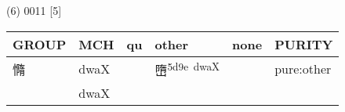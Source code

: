 \documentclass[14pt,a4paper]{scrartcl}
\begin{document}
(6) 0011 {[}5{]}

\begin{longtable}[c]{@{}llllll@{}}
\toprule
\begin{minipage}[b]{0.14\columnwidth}\raggedright\strut
GROUP
\strut\end{minipage} &
\begin{minipage}[b]{0.14\columnwidth}\raggedright\strut
MCH
\strut\end{minipage} &
\begin{minipage}[b]{0.14\columnwidth}\raggedright\strut
qu
\strut\end{minipage} &
\begin{minipage}[b]{0.14\columnwidth}\raggedright\strut
other
\strut\end{minipage} &
\begin{minipage}[b]{0.14\columnwidth}\raggedright\strut
none
\strut\end{minipage} &
\begin{minipage}[b]{0.14\columnwidth}\raggedright\strut
PURITY
\strut\end{minipage}\tabularnewline
\midrule
\endhead
\begin{minipage}[t]{0.14\columnwidth}\raggedright\strut
憜
\strut\end{minipage} &
\begin{minipage}[t]{0.14\columnwidth}\raggedright\strut
dwaX
\strut\end{minipage} &
\begin{minipage}[t]{0.14\columnwidth}\raggedright\strut
\strut\end{minipage} &
\begin{minipage}[t]{0.14\columnwidth}\raggedright\strut
嶞\textsuperscript{5d9e~dwaX}
\strut\end{minipage} &
\begin{minipage}[t]{0.14\columnwidth}\raggedright\strut
\strut\end{minipage} &
\begin{minipage}[t]{0.14\columnwidth}\raggedright\strut
pure:other
\strut\end{minipage}\tabularnewline
\begin{minipage}[t]{0.14\columnwidth}\raggedright\strut
𢀡
\strut\end{minipage} &
\begin{minipage}[t]{0.14\columnwidth}\raggedright\strut
dwaX
\strut\end{minipage} &
\begin{minipage}[t]{0.14\columnwidth}\raggedright\strut
\strut\end{minipage} &

\end{longtable}
\end{document}
